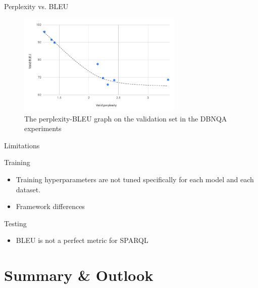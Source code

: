 \documentclass[11pt]{beamer}
\begin{document}
\begin{frame}{Perplexity vs. BLEU}
    \begin{figure}
        \includegraphics[width=0.7\textwidth]{perplexity-bleu}
        \centering
        \caption{The perplexity-BLEU graph on the validation set in the DBNQA experiments}
    \end{figure}
\end{frame}

\begin{frame}{Limitations}

    \begin{block}{Training}
        \begin{itemize}
            \item Training hyperparameters are not tuned specifically for each model and each dataset.
            \item Framework differences
        \end{itemize}
    \end{block}

    \begin{block}{Testing}
        \begin{itemize}
            \item BLEU is not a perfect metric for SPARQL
        \end{itemize}
    \end{block}

\end{frame}

\section{Summary \& Outlook}
\end{document}
